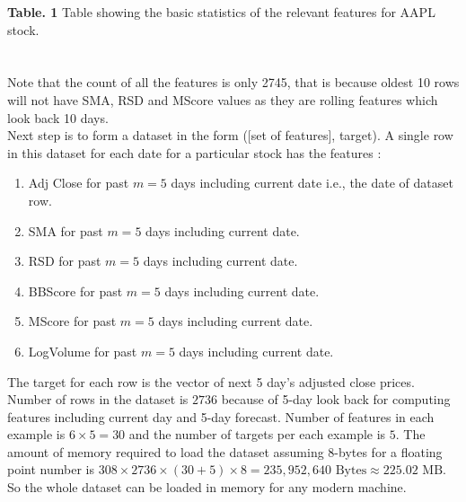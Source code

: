 \documentclass[10pt]{report}
\begin{document}
\textbf{Table. 1} Table showing the basic statistics of the relevant features for AAPL stock.\\
\\
\\
Note that the count of all the features is only 2745, that is because oldest 10 rows will not have SMA, RSD and MScore values as they are rolling features which look back 10 days.\\
Next step is to form a dataset in the form ([set of features], target). A single row in this dataset for each date for a particular stock has the features :
\begin{enumerate}
\item Adj Close for past $m=5$ days including current date i.e., the date of dataset row.
\item SMA for past $m=5$ days including current date.
\item RSD for past $m=5$ days including current date.
\item BBScore for past $m=5$ days including current date.
\item MScore for past $m=5$ days including current date.
\item LogVolume for past $m=5$ days including current date.
\end{enumerate}
The target for each row is the vector of next 5 day's adjusted close prices. Number of rows in the dataset is $2736$ because of  5-day look back for computing features including current day and 5-day forecast. Number of features in each example is $6 \times 5 = 30$ and the number of targets per each example is $5$. The amount of memory required to load the dataset assuming 8-bytes for a floating point number is $ 308 \times 2736 \times ( 30  +  5 ) \times 8 = 235,952,640 \text{ Bytes} \approx 225.02 \text{ MB}$. So the whole dataset can be loaded in memory for any modern machine.
\end{document}
